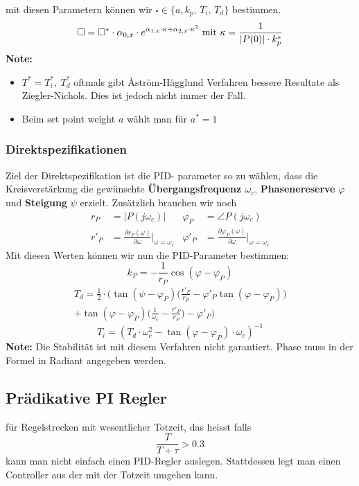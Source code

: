             mit diesen Parametern können wir $\square \in \{a, k_p,\, T_i,\, T_d\}$ bestimmen.
            \[ \square = \square^* \cdot \alpha_{0,x} \cdot e^{\alpha_{1,x} \cdot \kappa + \alpha_{2,x} \cdot \kappa^2}
            \ \textnormal{mit} \ \kappa = \frac{1}{|P(0)| \cdot k_p^*} \]
            \textbf{Note:}
            \begin{itemize}
                \item $T^* = T_i^*,\  T_d^*$ oftmals gibt \r{A}ström-Hägglund Verfahren bessere Resultate als Ziegler-Nichols. Dies ist jedoch nicht immer der Fall. 
                \item Beim set point weight $a$ wählt man für $a^* = 1$ 
            \end{itemize}
            
    \subsubsection{Direktspezifikationen} 
        Ziel der Direktspezifikation ist die PID- parameter so zu wählen, dass die Kreisverstärkung die gewünschte \textbf{Übergangsfrequenz $\omega_c$}, \textbf{Phasenereserve} $\varphi$ und \textbf{Steigung} $\psi$ erzielt. Zusätzlich brauchen wir noch 
        \begin{align*}
        r_P &= |P(j\omega_c)|   &   \varphi_P &= \angle P(j\omega_c)\\
        r'_P &= \frac{\partial r_P(\omega)}{\partial\omega}\Bigg|_{\omega=\omega_c} & \varphi'_P &= \frac{\partial \varphi_P(\omega)}{\partial\omega}\Bigg |_{\omega=\omega_c}
        \end{align*}
        Mit diesen Werten können wir nun die PID-Parameter bestimmen:
        \[k_P = - \frac{1}{r_P}\cos(\varphi-\varphi_P)\]
        \begin{multline*}
        T_d =\frac{1}{2}\cdot\Bigg(\tan(\psi-\varphi_P)\Bigg(\frac{r'_P}{r_P}-\varphi'_P\tan(\varphi-\varphi_P)\Bigg)\\ + \tan(\varphi-\varphi_P) \Bigg(\frac{1}{\omega_c}-\frac{r'_P}{r_P}\Bigg)- \varphi'_P\Bigg)
        \end{multline*}
        \[T_i = (T_d\cdot \omega_c^2 - \tan(\varphi-\varphi_P)\cdot \omega_c)^{-1}\]
        \textbf{Note:} Die Stabilität ist mit diesem Verfahren nicht garantiert. Phase muss in der Formel in Radiant angegeben werden. 
\subsection{Prädikative PI Regler}
    für Regelstrecken mit wesentlicher Totzeit, das heisst falls 
    \[\frac{T}{T+\tau}>0.3\]
    kann man nicht einfach einen PID-Regler auslegen. Stattdessen legt man einen Controller aus der mit der Totzeit umgehen kann. 

